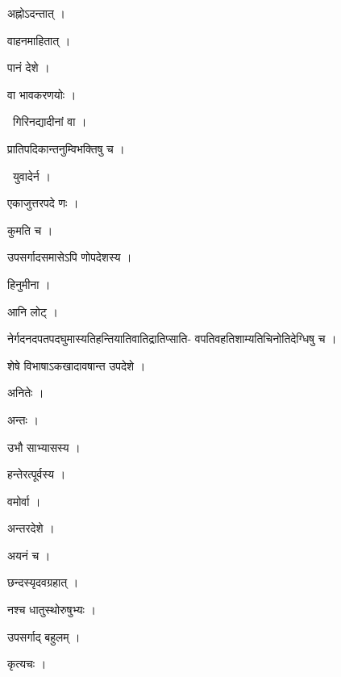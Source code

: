 \documentclass[10pt, openany, oneside]{book}
\begin{document}
\noindent अह्नोऽदन्तात् ।

\noindent वाहनमाहितात् ।

\noindent पानं देशे ।

\noindent वा भावकरणयोः ।

\par\noindent\hspace{1.5em}{\vps वा॰}~{\qt गिरिनद्यादीनां वा ।}

\noindent प्रातिपदिकान्तनुम्विभक्तिषु च ।

\par\noindent\hspace{1.5em}{\vps वा॰}~{\qt युवादेर्न ।}

\noindent एकाजुत्तरपदे णः ।

\noindent कुमति च ।

\noindent उपसर्गादसमासेऽपि णोपदेशस्य ।

\noindent हिनुमीना ।

\noindent आनि लोट् ।

\noindent नेर्गदनदपतपदघुमास्यतिहन्तियातिवातिद्रातिप्साति- वपतिवहतिशाम्यतिचिनोतिदेग्धिषु च ।

\noindent शेषे विभाषाऽकखादावषान्त उपदेशे ।

\noindent अनितेः ।

\noindent अन्तः ।

\noindent उभौ साभ्यासस्य ।

\noindent हन्तेरत्पूर्वस्य ।

\noindent वमोर्वा ।

\noindent अन्तरदेशे ।

\noindent अयनं च ।

\noindent छन्दस्यृदवग्रहात् ।

\noindent नश्च धातुस्थोरुषुभ्यः ।

\noindent उपसर्गाद् बहुलम् ।

\noindent कृत्यचः ।
\end{document}
